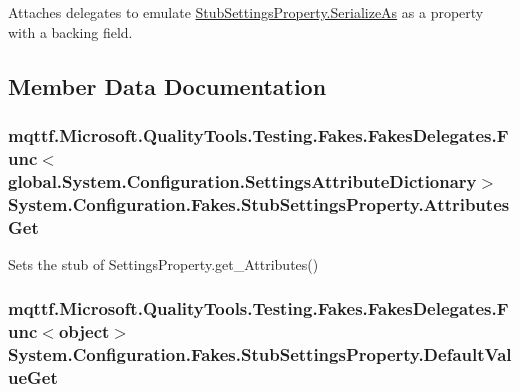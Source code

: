 Attaches delegates to emulate \hyperlink{class_system_1_1_configuration_1_1_fakes_1_1_stub_settings_property_a0ad233811003228dbbef64e61ed5fa25}{Stub\-Settings\-Property.\-Serialize\-As} as a property with a backing field.



\subsection{Member Data Documentation}
\hypertarget{class_system_1_1_configuration_1_1_fakes_1_1_stub_settings_property_af0a78eea4533b9cebd90c27ba0746d65}{
\subsubsection[{Attributes\-Get}]{\setlength{\rightskip}{0pt plus 5cm}mqttf.\-Microsoft.\-Quality\-Tools.\-Testing.\-Fakes.\-Fakes\-Delegates.\-Func$<$global.\-System.\-Configuration.\-Settings\-Attribute\-Dictionary$>$ System.\-Configuration.\-Fakes.\-Stub\-Settings\-Property.\-Attributes\-Get}}\label{class_system_1_1_configuration_1_1_fakes_1_1_stub_settings_property_af0a78eea4533b9cebd90c27ba0746d65}


Sets the stub of Settings\-Property.\-get\-\_\-\-Attributes()

\hypertarget{class_system_1_1_configuration_1_1_fakes_1_1_stub_settings_property_a0f8b91c81a312617dc202c6cdcb1e242}{
\subsubsection[{Default\-Value\-Get}]{\setlength{\rightskip}{0pt plus 5cm}mqttf.\-Microsoft.\-Quality\-Tools.\-Testing.\-Fakes.\-Fakes\-Delegates.\-Func$<$object$>$ System.\-Configuration.\-Fakes.\-Stub\-Settings\-Property.\-Default\-Value\-Get}}\label{class_system_1_1_configuration_1_1_fakes_1_1_stub_settings_property_a0f8b91c81a312617dc202c6cdcb1e242}


